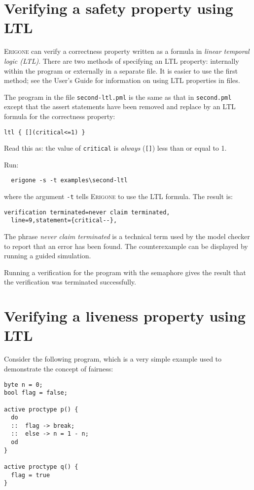 \documentclass[11pt]{article}
\newcommand*{\prg}{\textsc{Erigone}}
\newcommand*{\p}[1]{\texttt{#1}}
\begin{document}
\section{Verifying a safety property using LTL}

\prg{} can verify a correctness property written as a formula in
\emph{linear temporal logic (LTL)}. There are two methods of specifying
an LTL property: internally within the program or externally in a
separate file. It is easier to use the first method; see the User's
Guide for information on using LTL properties in files.

The program in the file \p{second-ltl.pml} is the same as that in
\p{second.pml} except that the assert statements have been removed and
replace by an LTL formula for the correctness property:

\begin{verbatim}
ltl { [](critical<=1) }
\end{verbatim}
Read this as: the value of \p{critical} is \emph{always} (\p{[]}) less
than or equal to 1.

Run:
\begin{verbatim}
  erigone -s -t examples\second-ltl
\end{verbatim}
where the argument \p{-t} tells \prg{} to use the LTL formula. The
result is:
\begin{verbatim}
verification terminated=never claim terminated,
  line=9,statement={critical--},
\end{verbatim}

The phrase \emph{never claim terminated} is a technical term used by the
model checker to report that an error has been found. The counterexample
can be displayed by running a guided simulation.

Running a verification for the program with the semaphore gives the
result that the verification was terminated successfully.

\section{Verifying a liveness property using LTL}

Consider the following program, which is a very simple example used to
demonstrate the concept of fairness:

\begin{verbatim}
byte n = 0;
bool flag = false;

active proctype p() {
  do
  ::  flag -> break;
  ::  else -> n = 1 - n;
  od
}

active proctype q() {
  flag = true
}
\end{verbatim}
\end{document}
